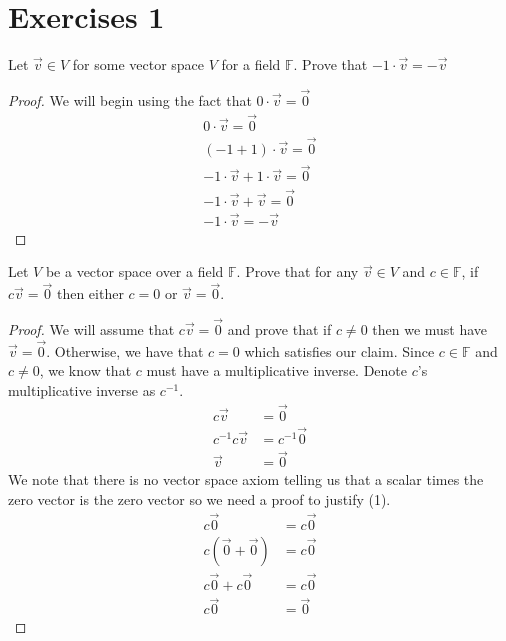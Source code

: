 \section{Exercises 1}
\begin{exercise}
    Let $\vec{v}\in V$ for some vector space $V$ for a field $\mathbb{F}$. Prove that $-1\cdot\vec{v}=-\vec{v}$
\end{exercise}
\begin{proof}
We will begin using the fact that $0\cdot\vec{v}=\vec{0}$
    \begin{align*}
        0\cdot\vec{v}=\vec{0}\\
        (-1+1)\cdot\vec{v}=\vec{0}\\
        -1\cdot\vec{v}+1\cdot\vec{v}=\vec{0}\tag{by Vector over Scalar Distributivity}\\
        -1\cdot\vec{v}+\vec{v}=\vec{0}\tag{by Identity Multiplication}\\
        -1\cdot\vec{v}=-\vec{v}\tag{by Additive Inverse}
    \end{align*}
\end{proof}
\begin{exercise}
    Let $V$ be a vector space over a field $\mathbb{F}$. Prove that for any $\vec{v}\in V$ and $c\in\mathbb{F}$, if $c\vec{v}=\vec{0}$ then either $c=0$ or $\vec{v}=\vec{0}$.
\end{exercise}
\begin{proof}
    We will assume that $c\vec{v}=\vec{0}$ and prove that if $c\neq 0$ then we must have $\vec{v}=\vec{0}$. Otherwise, we have that $c=0$ which satisfies our claim. Since $c\in\mathbb{F}$ and $c\neq 0$, we know that $c$ must have a multiplicative inverse. Denote $c$'s multiplicative inverse as $c^{-1}$.
    \begin{align*}
        c\vec{v}&=\vec{0}\\
        c^{-1}c\vec{v}&=c^{-1}\vec{0}\\
        \vec{v}&=\vec{0}\tag{1}
    \end{align*}
    We note that there is no vector space axiom telling us that a scalar times the zero vector is the zero vector so we need a proof to justify (1).
    \begin{align*}
        c\vec{0}&=c\vec{0}\\
        c(\vec{0}+\vec{0})&=c\vec{0}\tag{Additive Identity}\\
        c\vec{0}+c\vec{0}&=c\vec{0}\tag{Scalar Over Vector Distributivity}\\
        c\vec{0}&=\vec{0}\tag{Additive Inverse}
    \end{align*}
\end{proof}

